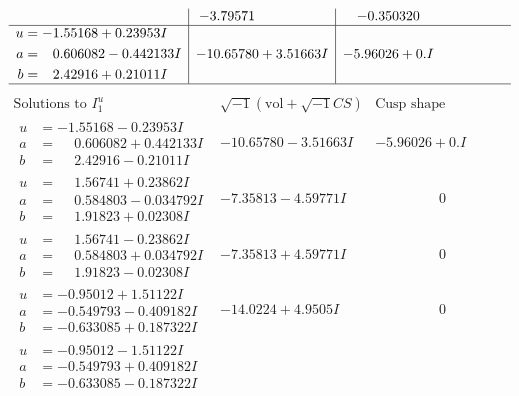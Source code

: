 \documentclass[1p]{elsarticle_modified}
\theoremstyle{definition}
\newcommand{\I}{\sqrt{-1}}
\begin{document}
$$\begin{array}{c|c|c}
 & -3.79571\phantom{ +0.000000I} & -0.350320\phantom{ +0.000000I} \\ \hline\begin{aligned}
u &= -1.55168 + 0.23953 I \\
a &= \phantom{-}0.606082 - 0.442133 I \\
b &= \phantom{-}2.42916 + 0.21011 I\end{aligned}
 & -10.65780 + 3.51663 I & -5.96026 + 0. I\phantom{ +0.000000I}\\
 \hline 
 \end{array}$$\newpage$$\begin{array}{c|c|c}  
\text{Solutions to }I^u_{1}& \I (\text{vol} + \sqrt{-1}CS) & \text{Cusp shape}\\
 \hline 
\begin{aligned}
u &= -1.55168 - 0.23953 I \\
a &= \phantom{-}0.606082 + 0.442133 I \\
b &= \phantom{-}2.42916 - 0.21011 I\end{aligned}
 & -10.65780 - 3.51663 I & -5.96026 + 0. I\phantom{ +0.000000I} \\ \hline\begin{aligned}
u &= \phantom{-}1.56741 + 0.23862 I \\
a &= \phantom{-}0.584803 - 0.034792 I \\
b &= \phantom{-}1.91823 + 0.02308 I\end{aligned}
 & -7.35813 - 4.59771 I & \phantom{-0.000000 } 0 \\ \hline\begin{aligned}
u &= \phantom{-}1.56741 - 0.23862 I \\
a &= \phantom{-}0.584803 + 0.034792 I \\
b &= \phantom{-}1.91823 - 0.02308 I\end{aligned}
 & -7.35813 + 4.59771 I & \phantom{-0.000000 } 0 \\ \hline\begin{aligned}
u &= -0.95012 + 1.51122 I \\
a &= -0.549793 - 0.409182 I \\
b &= -0.633085 + 0.187322 I\end{aligned}
 & -14.0224 + 4.9505 I & \phantom{-0.000000 } 0 \\ \hline\begin{aligned}
u &= -0.95012 - 1.51122 I \\
a &= -0.549793 + 0.409182 I \\
b &= -0.633085 - 0.187322 I\end{aligned}

\end{array}$$
\end{document}

